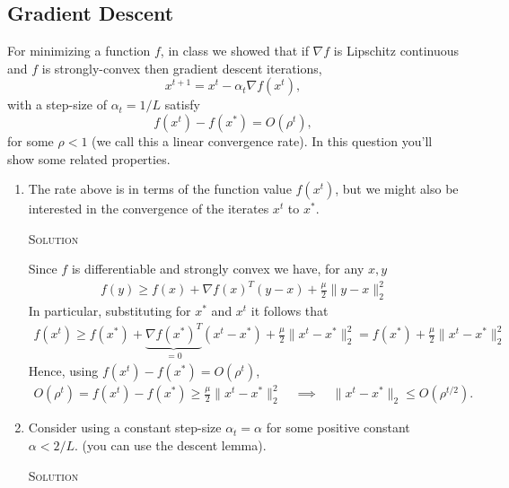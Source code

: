\documentclass{article}
\begin{document}
\subsection{Gradient Descent}

For minimizing a function $f$, in class we showed that if $\nabla f$ is Lipschitz continuous and $f$ is strongly-convex then gradient descent iterations,
\[
x^{t+1} = x^t - \alpha_t\nabla f(x^t),
\] 
with a step-size of $\alpha_t = 1/L$ satisfy
\[
f(x^t) - f(x^*) = O(\rho^t),
\]
for some $\rho < 1$ (we call this a linear convergence rate).
In this question you'll show some related properties.
\begin{enumerate}
\item The rate above is in terms of the function value $f(x^t)$, but we
  might also be interested in the convergence of the iterates $x^t$ to
  $x^*$. 

  \textsc{Solution}

  Since $f$ is differentiable and strongly convex we have, for any $x, y$
  \begin{align*}
    f(y) \geq f(x) + \nabla f(x)^T(y-x) + \frac{\mu}{2} \|y-x\|_2^2
  \end{align*}
  In particular, substituting for $x^*$ and $x^t$ it follows that
  \begin{align*}
    f(x^t) %
    \geq f(x^*) %
    + \underbrace{\nabla f(x^*)^T}_{=0} (x^t - x^*) %
    + \frac{\mu}{2} \|x^t - x^*\|_2^2 %
    = f(x^*) + \frac{\mu}{2} \|x^t - x^*\|_2^2
  \end{align*}
  Hence, using $f(x^t) - f(x^*) = O(\rho^t)$,
  \begin{align*}
    O(\rho^t) = f(x^t) - f(x^*) \geq \frac{\mu}{2} \|x^t - x^*\|_2^2  %
    \quad \implies \quad %
    \|x^t - x^*\|_2 \leq O(\rho^{t/2}).
  \end{align*}

  
\item Consider using a constant step-size $\alpha_t = \alpha$ for some positive
  constant $\alpha < 2/L$.  (you can use the descent lemma).

  \textsc{Solution}


\end{enumerate}
\end{document}
